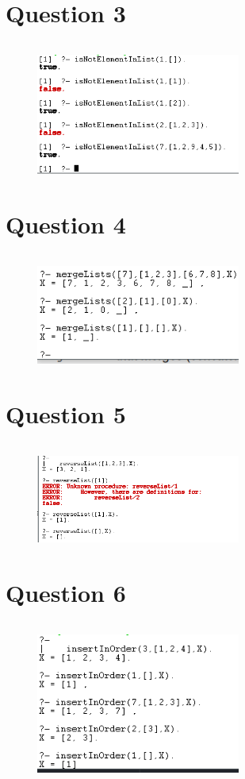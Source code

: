 \documentclass{article}
\begin{document}
	\section{Question 3}
	\inputminted{prolog}{question3.pl}
	\begin{figure}[h!]
		\centering
		\includegraphics[width=0.6\textwidth]{question3.png}
	\end{figure}
	\section{Question 4}
	\inputminted{prolog}{question4.pl}
	\begin{figure}[h!]
		\centering
		\includegraphics[width=0.6\textwidth]{question4.png}
	\end{figure}
	\newpage
	\section{Question 5}
	\inputminted{prolog}{question5.pl}
	\begin{figure}[h!]
		\centering
		\includegraphics[width=0.6\textwidth]{question5.png}
	\end{figure}
	\section{Question 6}
	\inputminted{prolog}{question6.pl}
	\begin{figure}[h!]
		\centering
		\includegraphics[width=0.6\textwidth]{question6.png}
	\end{figure}
	
	
\end{document}
